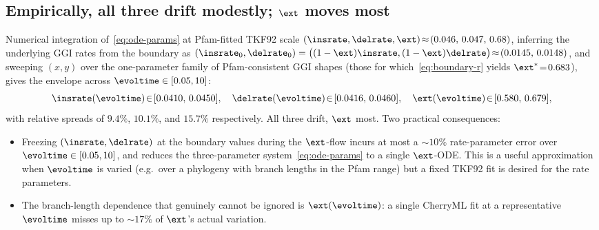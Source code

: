 \subsection{Empirically, all three drift modestly; \texorpdfstring{$\fragext$}{r} moves most}
\label{sec:comp-tameness}

Numerical integration of~\eqref{eq:ode-params} at Pfam-fitted TKF92 scale
$(\insrate,\delrate,\fragext)\!\approx\!(0.046,\,0.047,\,0.68)$,
inferring the underlying GGI rates from the boundary as
$(\insrate_0,\delrate_0)=\bigl((1-\fragext)\insrate,(1-\fragext)\delrate\bigr)\!\approx\!(0.0145,\,0.0148)$,
and sweeping $(x,y)$ over the one-parameter family of Pfam-consistent
GGI shapes (those for which~\eqref{eq:boundary-r} yields
$\fragext^\ast\!=\!0.683$), gives the envelope across $\evoltime\in[0.05,10]$:
\begin{equation}
\label{eq:pfam-ranges}
\insrate(\evoltime)\!\in\![0.0410,\,0.0450],\quad
\delrate(\evoltime)\!\in\![0.0416,\,0.0460],\quad
\fragext(\evoltime)\!\in\![0.580,\,0.679],
\end{equation}
with relative spreads of $9.4\%$, $10.1\%$, and $15.7\%$ respectively.  All
three drift, $\fragext$ most.  Two practical consequences:
\begin{itemize}[nosep]
\item Freezing $(\insrate,\delrate)$ at the boundary values during the
$\fragext$-flow incurs at most a $\sim\!10\%$ rate-parameter error over
$\evoltime\in[0.05,10]$, and reduces the three-parameter
system~\eqref{eq:ode-params} to a single $\fragext$-ODE.  This is a
useful approximation when $\evoltime$ is varied (e.g.\ over a phylogeny
with branch lengths in the Pfam range) but a fixed TKF92 fit is desired
for the rate parameters.
\item The branch-length dependence that genuinely cannot be ignored is
$\fragext(\evoltime)$: a single CherryML fit at a representative
$\evoltime$ misses up to $\sim\!17\%$ of $\fragext$'s actual variation.
\end{itemize}
